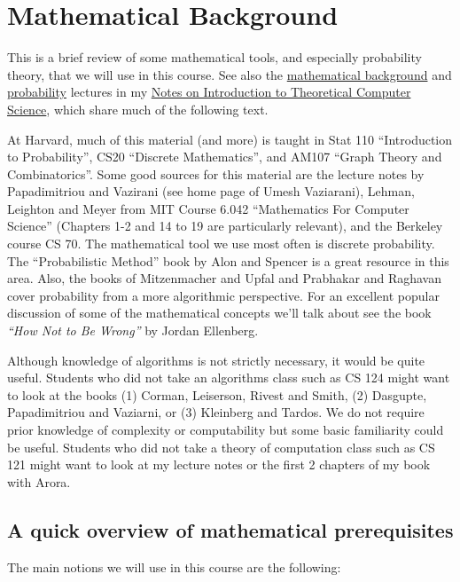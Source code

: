 \chapter{Mathematical Background}\label{Mathematical-Background}

This is a brief review of some mathematical tools, and especially
probability theory, that we will use in this course. See also the
\href{http://www.introtcs.org/public/lec_00_1_math_background.html}{mathematical
background} and
\href{http://www.introtcs.org/public/lec_15_probability.html}{probability}
lectures in my \href{http://www.introtcs.org/}{Notes on Introduction to
Theoretical Computer Science}, which share much of the following text.

At Harvard, much of this material (and more) is taught in Stat 110
``Introduction to Probability'', CS20 ``Discrete Mathematics'', and
AM107 ``Graph Theory and Combinatorics''. Some good sources for this
material are the lecture notes by Papadimitriou and Vazirani (see home
page of Umesh Vaziarani), Lehman, Leighton and Meyer from MIT Course
6.042 ``Mathematics For Computer Science'' (Chapters 1-2 and 14 to 19
are particularly relevant), and the Berkeley course CS 70. The
mathematical tool we use most often is discrete probability. The
``Probabilistic Method'' book by Alon and Spencer is a great resource in
this area. Also, the books of Mitzenmacher and Upfal and Prabhakar and
Raghavan cover probability from a more algorithmic perspective. For an
excellent popular discussion of some of the mathematical concepts we'll
talk about see the book \emph{``How Not to Be Wrong''} by Jordan
Ellenberg.

Although knowledge of algorithms is not strictly necessary, it would be
quite useful. Students who did not take an algorithms class such as CS
124 might want to look at the books (1) Corman, Leiserson, Rivest and
Smith, (2) Dasgupte, Papadimitriou and Vaziarni, or (3) Kleinberg and
Tardos. We do not require prior knowledge of complexity or computability
but some basic familiarity could be useful. Students who did not take a
theory of computation class such as CS 121 might want to look at my
lecture notes or the first 2 chapters of my book with Arora.

\section{A quick overview of mathematical
prerequisites}\label{A-quick-overview-of-mathematic}

The main notions we will use in this course are the following:

